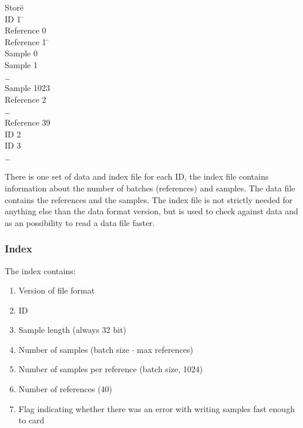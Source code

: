 \documentclass[a4paper]{article}
\begin{document}
\begin{multicols}{2}
    \begin{tabbing}
    Store\= \+ \\
      ID 1 \=  \+ \\
        Reference 0 \= \\
        Reference 1 \= \+ \\
          Sample 0 \\
          Sample 1 \\
          \dots \\
          Sample 1023 \- \\
        Reference 2 \\
        \dots \\
        Reference 39 \- \\
      ID 2 \\
      ID 3 \\
      \dots
    \end{tabbing}
    \label{tbl:store_structure}

    There is one set of data and index file for each ID, the index file
    contains information about the number of batches (references) and
    samples. The data file contains the references and the samples.
    The index file is not strictly needed for anything else than
    the data format version, but is used to check against data and as an
    possibility to read a data file faster.

    \subsubsection{Index}
    The index contains:
    \begin{enumerate}
      \item Version of file format
      \item ID
      \item Sample length (always 32 bit)
      \item Number of samples (batch size $\cdot$ max references)
      \item Number of samples per reference (batch size, 1024)
      \item Number of references (40)
      \item Flag indicating whether there was an error with writing
        samples fast enough to card
    \end{enumerate}


\end{multicols}
\end{document}
